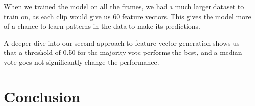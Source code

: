 \documentclass[10pt,twocolumn,letterpaper]{article}
\begin{document}
When we trained the model on all the frames, we had a much larger dataset to train on, as each clip would give us 60
feature vectors. This gives the model more of a chance to learn patterns in the data to make its predictions. 

A deeper dive into our second approach to feature vector generation shows us that a threshold of 0.50 for the majority vote
performs the best, and a median vote goes not significantly change the performance.

\section{Conclusion}




{\small


}
\end{document}
